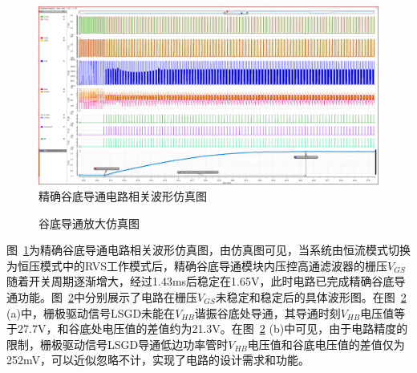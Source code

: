 \begin{figure}[htbp] 
    \centering
    \includegraphics[width=0.8\linewidth]{figures/valley_switch.png}
    \caption{精确谷底导通电路相关波形仿真图}
    \label{fig:谷底导通仿真图}
\end{figure} 


\begin{figure}[htbp]
	\centering
	\caption{谷底导通放大仿真图}
	\label{fig:谷底导通放大仿真图}
\end{figure}

图~\ref{fig:谷底导通仿真图}为精确谷底导通电路相关波形仿真图，由仿真图可见，当系统由恒流模式切换为恒压模式中的RVS工作模式后，精确谷底导通模块内压控高通滤波器的栅压$V_{GS}$随着开关周期逐渐增大，经过1.43ms后稳定在1.65V，此时电路已完成精确谷底导通功能。图~\ref{fig:谷底导通放大仿真图}中分别展示了电路在栅压$V_{GS}$未稳定和稳定后的具体波形图。在图~\ref{fig:谷底导通放大仿真图} (a)中，栅极驱动信号LSGD未能在$V_{HB}$谐振谷底处导通，其导通时刻$V_{HB}$电压值等于27.7V，和谷底处电压值的差值约为21.3V。在图~\ref{fig:谷底导通放大仿真图} (b)中可见，由于电路精度的限制，栅极驱动信号LSGD导通低边功率管时$V_{HB}$电压值和谷底电压值的差值仅为252mV，可以近似忽略不计，实现了电路的设计需求和功能。

